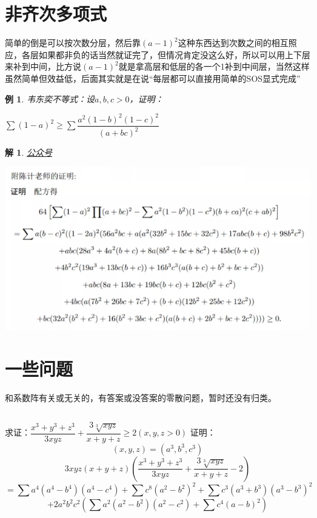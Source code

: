 \documentclass[UTF8]{ctexart}
\newtheorem{1}{例}
\newtheorem{2}{解}
\begin{document}
\section{非齐次多项式}
简单的倒是可以按次数分层，然后靠$ (a-1)^{2} $这种东西达到次数之间的相互照应，各层如果都非负的话当然就证完了，但情况肯定没这么好，所以可以用上下层来补到中间，比方说$ (a-1)^{2} $就是拿高层和低层的各一个1补到中间层，当然这样虽然简单但效益低，后面其实就是在说“每层都可以直接用简单的SOS显式完成”
\begin{1}
	韦东奕不等式：设$ a,b,c> 0 $，证明：\\
	\begin{center}
		$ \displaystyle \sum (1-a)^{2}\geq \displaystyle \sum \dfrac{a^{2}(1-b)^{2}(1-c)^{2}}{(a+bc)^{2}} $
	\end{center}
\end{1}
\begin{2}
	\href{https://mp.weixin.qq.com/s/HswqcHJEWK8s-WV68PIqog}{公众号}
	\begin{center}
		\includegraphics[width=0.8\linewidth]{46}
	\end{center}
\end{2}
\section{一些问题}
和系数阵有关或无关的，有答案或没答案的零散问题，暂时还没有归类。
\subsection{}
求证：$ \displaystyle \dfrac{x^{3}+y^{3}+z^{3}}{3 x y z}+\displaystyle \dfrac{3 \sqrt[3]{x y z}}{x+y+z} \geq 2(x, y, z>0) $
证明：
$$ (x, y, z)=(a^{3}, b^{3}, c^{3}) $$
$$3 x y z(x+y+z)(\displaystyle \dfrac{x^{3}+y^{3}+z^{3}}{3 x y z}+\displaystyle \dfrac{3 \sqrt[3]{x y z}}{x+y+z}-2) $$
$$ =\displaystyle \sum a^{4}(a^{4}-b^{4})(a^{4}-c^{4})+\displaystyle \sum c^{8}(a^{2}-b^{2})^{2}+\displaystyle \sum c^{3}(a^{3}+b^{3})(a^{3}-b^{3})^{2} $$
$$ +2 a^{2} b^{2} c^{2}(\displaystyle \sum a^{2}(a^{2}-b^{2})(a^{2}-c^{2})+\displaystyle \sum c^{4}(a-b)^{2}) $$
\end{document}
